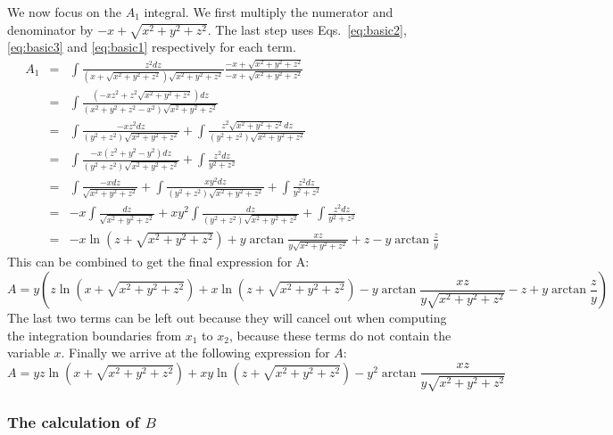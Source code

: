 We now focus on the $A_1$ integral. 
We first multiply the numerator and denominator by $-x+\sqrt{x^2+y^2+z^2} $. The last step uses Eqs.~\eqref{eq:basic2}, \eqref{eq:basic3} and \eqref{eq:basic1} respectively for each term.
\begin{eqnarray}
A_1 
&=& \int \frac{z^2 dz}{\left( x+\sqrt{x^2+y^2+z^2} \right) \sqrt{x^2+y^2+z^2}}
\frac{-x+\sqrt{x^2+y^2+z^2}}{-x+\sqrt{x^2+y^2+z^2}} \nonumber\\
&=& \int \frac{(-x z^2 + z^2 \sqrt{x^2+y^2+z^2} )dz}{\left( x^2+y^2+z^2 - x^2 \right) \sqrt{x^2+y^2+z^2}} \label{eq:der_U_2} \nonumber\\
&=& 
\int \frac{-x z^2 dz}{\left( y^2+z^2  \right) \sqrt{x^2+y^2+z^2}}  
+ \int \frac{z^2 \sqrt{x^2+y^2+z^2} dz}{\left( y^2+z^2  \right) \sqrt{x^2+y^2+z^2}} \nonumber\\
&=& \int \frac{-x \left( z^2 + y^2 -y^2 \right) dz}{(y^2+z^2)\sqrt{x^2+y^2+z^2}} + 
\int \frac{z^2dz}{y^2+z^2} \nonumber\\
&=& \int \frac{-x dz}{\sqrt{x^2+y^2+z^2}} + 
\int \frac{x y^2 dz}{(y^2+z^2)\sqrt{x^2+y^2+z^2}} + 
\int \frac{z^2dz}{y^2+z^2} \nonumber\\
&=& -x \int \frac{ dz}{\sqrt{x^2+y^2+z^2}} + 
x y^2 \int \frac{ dz}{(y^2+z^2)\sqrt{x^2+y^2+z^2}} + 
\int \frac{z^2dz}{y^2+z^2} \nonumber\\
&=& -x \ln{ \left( z + \sqrt{x^2+y^2+z^2} \right)} + 
y \arctan{\frac{x z}{y \sqrt{x^2+y^2+z^2}}} + 
z -  y \arctan{\frac{z}{y}}
\end{eqnarray}
This can be combined to get the final expression for A:
\begin{equation}
A = 
y \left( z \ln{ \left( x + \sqrt{x^2+y^2+z^2} \right)} + 
x \ln{ \left( z + \sqrt{x^2+y^2+z^2} \right)} -  
y \arctan{\frac{x z}{y \sqrt{x^2+y^2+z^2}}} - 
z + 
y \arctan{\frac{z}{y}} \right)
\end{equation}
The last two terms can be left out because they will cancel out when computing the integration boundaries from $x_1$ to $x_2$, because these terms do not contain the variable $x$. 
Finally we arrive at the following expression for $A$:
\begin{equation}
A = 
yz \ln{\left( x + \sqrt{x^2+y^2+z^2} \right)} + 
xy \ln{\left( z + \sqrt{x^2+y^2+z^2} \right)} - 
y^2 \arctan{\frac{xz}{y\sqrt{x^2+y^2+z^2}}}
\end{equation}



\subsubsection{The calculation of $B$}

